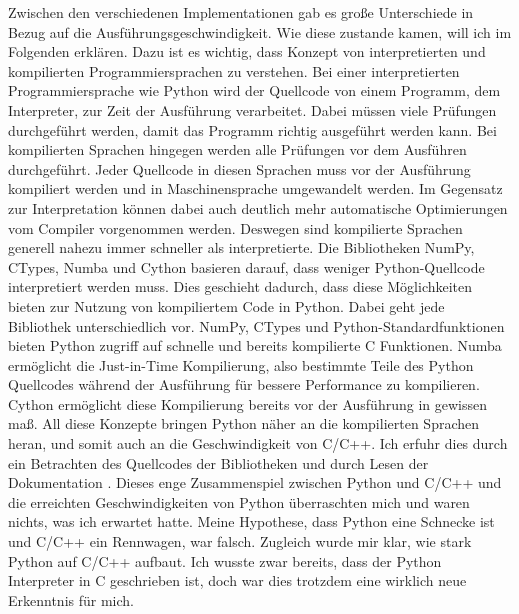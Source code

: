 \documentclass[11pt,a4paper]{article}
\begin{document}
Zwischen den verschiedenen Implementationen gab es große Unterschiede in Bezug auf die
Ausführungsgeschwindigkeit. Wie diese zustande kamen, will ich im Folgenden erklären.
Dazu ist es wichtig, dass Konzept von interpretierten und kompilierten
Programmiersprachen zu verstehen. Bei einer interpretierten Programmiersprache wie
Python wird der Quellcode von einem Programm, dem Interpreter, zur Zeit der Ausführung verarbeitet.
Dabei müssen viele Prüfungen durchgeführt werden, damit das Programm richtig ausgeführt werden kann.
Bei kompilierten Sprachen hingegen werden alle Prüfungen vor dem Ausführen durchgeführt.
Jeder Quellcode in diesen Sprachen muss vor der Ausführung kompiliert werden und in
Maschinensprache umgewandelt werden. Im Gegensatz zur Interpretation können dabei auch deutlich
mehr automatische Optimierungen vom Compiler vorgenommen werden.
Deswegen sind kompilierte Sprachen generell nahezu immer schneller als interpretierte.
Die Bibliotheken NumPy, CTypes, Numba und Cython basieren darauf, dass weniger Python-Quellcode
interpretiert werden muss. Dies geschieht dadurch, dass diese Möglichkeiten bieten zur
Nutzung von kompiliertem Code in Python.
Dabei geht jede Bibliothek unterschiedlich vor.
NumPy, CTypes und Python-Standardfunktionen bieten Python zugriff auf schnelle und
bereits kompilierte C Funktionen.
Numba ermöglicht die Just-in-Time Kompilierung, also bestimmte Teile des Python Quellcodes
während der Ausführung für bessere Performance zu kompilieren.
Cython ermöglicht diese Kompilierung bereits vor der Ausführung in gewissen maß.
All diese Konzepte bringen Python näher an die kompilierten Sprachen heran, und somit
auch an die Geschwindigkeit von C/C++. Ich erfuhr dies durch ein Betrachten des Quellcodes
der Bibliotheken und durch Lesen der Dokumentation \cite{pythonsource}
\cite{cythondocsnumpy} \cite{numbadoc} \cite{numpysource}.
Dieses enge Zusammenspiel zwischen Python und C/C++ und die erreichten Geschwindigkeiten
von Python überraschten mich und waren nichts, was ich erwartet hatte. Meine Hypothese,
dass Python eine Schnecke ist und C/C++ ein Rennwagen, war falsch.
Zugleich wurde mir klar, wie stark Python auf C/C++ aufbaut. Ich wusste zwar bereits,
dass der Python Interpreter in C geschrieben ist, doch war dies trotzdem eine wirklich
neue Erkenntnis für mich.
\end{document}
